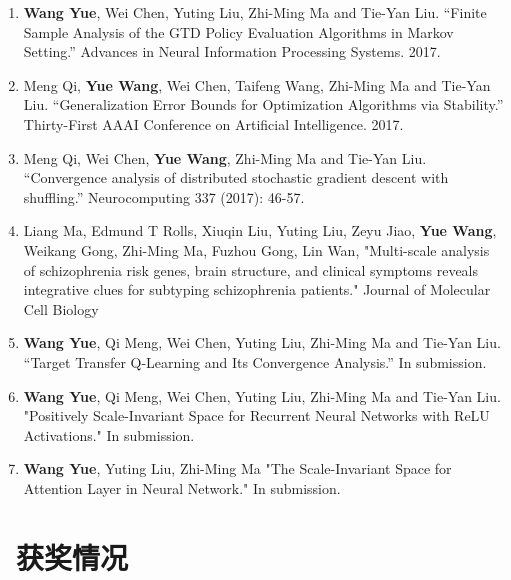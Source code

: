 \documentclass{resume}
\begin{document}
 \begin{enumerate}
 	\item \textbf{Wang Yue}, Wei Chen, Yuting Liu, Zhi-Ming Ma and Tie-Yan Liu. “Finite Sample Analysis of the GTD Policy Evaluation Algorithms in Markov Setting.” Advances in Neural Information Processing Systems. 2017. 
 	
 	\item Meng Qi, \textbf{Yue Wang}, Wei Chen, Taifeng Wang, Zhi-Ming Ma and Tie-Yan Liu. “Generalization Error Bounds for Optimization Algorithms via Stability.” Thirty-First AAAI Conference on Artificial Intelligence. 2017.
  	
 	\item Meng Qi, Wei Chen, \textbf{Yue Wang}, Zhi-Ming Ma and Tie-Yan Liu. “Convergence analysis of distributed stochastic gradient descent with shuffling.” Neurocomputing 337 (2017): 46-57.
 	
 	\item Liang Ma, Edmund T Rolls, Xiuqin Liu, Yuting Liu, Zeyu Jiao, \textbf{Yue Wang}, Weikang Gong, Zhi-Ming Ma, Fuzhou Gong, Lin Wan, "Multi-scale analysis of schizophrenia risk genes, brain structure, and clinical symptoms reveals integrative clues for subtyping schizophrenia   patients." Journal of Molecular Cell Biology
 	
 	 	
 	\item \textbf{Wang Yue}, Qi Meng, Wei Chen, Yuting Liu, Zhi-Ming Ma and Tie-Yan Liu. “Target Transfer Q-Learning and Its Convergence Analysis.” In submission.
 	
 	\item \textbf{Wang Yue}, Qi Meng, Wei Chen, Yuting Liu, Zhi-Ming Ma and Tie-Yan Liu.  "Positively Scale-Invariant Space for Recurrent Neural Networks with ReLU Activations." In submission.
 	
 	\item \textbf{Wang Yue}, Yuting Liu, Zhi-Ming Ma "The Scale-Invariant Space for Attention Layer in Neural  Network." In submission.
 \end{enumerate}



 




\section{\faHeartO\ 获奖情况}
\end{document}
